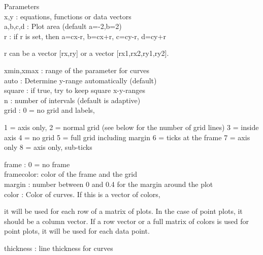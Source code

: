 \documentclass{article}
\newenvironment{eulernotebook}{\par}{\par}
\newenvironment{eulercomment}{\par\medskip}{\par\medskip}
\begin{document}
\begin{eulernotebook}
\begin{eulercomment}
\begin{eulercomment}
\begin{eulercomment}
\begin{eulercomment}
\begin{eulercomment}
Parameters
\\
x,y       : equations, functions or data vectors\\
a,b,c,d   : Plot area (default a=-2,b=2)\\
r         : if r is set, then a=cx-r, b=cx+r, c=cy-r, d=cy+r\\
\end{eulercomment}
\begin{eulerttcomment}
            r can be a vector [rx,ry] or a vector [rx1,rx2,ry1,ry2].
\end{eulerttcomment}
\begin{eulercomment}
xmin,xmax : range of the parameter for curves\\
auto      : Determine y-range automatically (default)\\
square    : if true, try to keep square x-y-ranges\\
n         : number of intervals (default is adaptive)\\
grid      : 0 = no grid and labels,\\
\end{eulercomment}
\begin{eulerttcomment}
            1 = axis only,
            2 = normal grid (see below for the number of grid lines)
            3 = inside axis
            4 = no grid
            5 = full grid including margin
            6 = ticks at the frame
            7 = axis only
            8 = axis only, sub-ticks
\end{eulerttcomment}
\begin{eulercomment}
frame     : 0 = no frame\\
framecolor: color of the frame and the grid\\
margin    : number between 0 and 0.4 for the margin around the plot\\
color     : Color of curves. If this is a vector of colors,\\
\end{eulercomment}
\begin{eulerttcomment}
            it will be used for each row of a matrix of plots. In the case of
            point plots, it should be a column vector. If a row vector or a
            full matrix of colors is used for point plots, it will be used for
            each data point.
\end{eulerttcomment}
\begin{eulercomment}
thickness : line thickness for curves\\
\end{eulercomment}

\end{eulercomment}
\end{eulercomment}
\end{eulercomment}
\end{eulercomment}
\end{eulernotebook}
\end{document}

